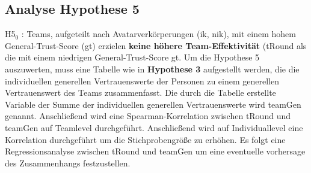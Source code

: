 \documentclass[a4paper,11pt]{article}%
\renewcommand{\\}{\vspace*{0.5\baselineskip} \newline}
\begin{document}
\newpage
	\subsection{Analyse Hypothese 5}
H5$_{0}$ : Teams, aufgeteilt nach Avatarverkörperungen (\ac{ik}, \ac{nik}), mit einem hohem General-Trust-Score (\ac{gt}) erzielen \textbf{keine höhere Team-Effektivität} (\ac{tRound} als die mit einem niedrigen General-Trust-Score \ac{gt}.\\
Um die Hypothese 5 auszuwerten, muss eine Tabelle wie in \textbf{Hypothese 3} aufgestellt werden, die die individuellen generellen Vertrauenswerte der Personen zu einem generellen Vertrauenswert des Teams zusammenfasst. Die durch die Tabelle erstellte Variable der Summe der individuellen generellen Vertrauenswerte wird \ac{teamGen} genannt.
Anschließend wird eine Spearman-Korrelation zwischen \ac{tRound} und \ac{teamGen} auf Teamlevel durchgeführt. Anschließend wird auf Individuallevel eine Korrelation durchgeführt um die Stichprobengröße zu erhöhen. Es folgt eine Regressionsanalyse zwischen \ac{tRound} und \ac{teamGen} um eine eventuelle vorhersage des Zusammenhangs festzustellen.
\end{document}
